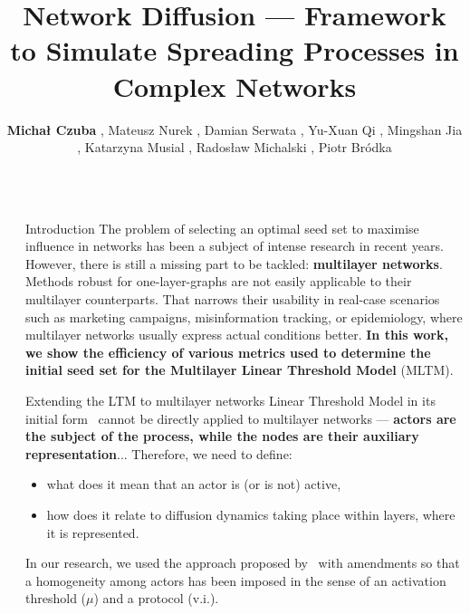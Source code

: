 \documentclass[final]{beamer}
\title{Network Diffusion --- Framework to Simulate Spreading Processes in Complex Networks}
\author{
    \textbf{Micha{\l} Czuba} \inst{1},
    Mateusz Nurek \inst{1},
    Damian Serwata \inst{1},
    Yu-Xuan Qi \inst{2},
    Mingshan Jia \inst{2},
    Katarzyna Musial \inst{2},
    Rados{\l}aw Michalski \inst{1},
    Piotr Br{\'o}dka \inst{1}
}
\institute[]{
  \inst{1} Wroc{\l}aw University of Science and Technology\\
  \inst{2} University of Technology Sydney
}
\newlength{\sepwidth}
\newlength{\colwidth}
\newcommand{\separatorcolumn}{\begin{column}{\sepwidth}\end{column}}
\begin{document}
\begin{frame}[t, fragile]
\begin{columns}[t]

\separatorcolumn
\begin{column}{\colwidth}

\begin{block}{Introduction}
    The problem of selecting an optimal seed set to maximise influence in networks has been a subject of intense research in recent years. However, there is still a missing part to be tackled: \textbf{multilayer networks}. Methods robust for one-layer-graphs are not easily applicable to their multilayer counterparts. That narrows their usability in real-case scenarios such as marketing campaigns, misinformation tracking, or epidemiology, where multilayer networks usually express actual conditions better. \textbf{In this work, we show the efficiency of various metrics used to determine the initial seed set for the Multilayer Linear Threshold Model} (MLTM).
\end{block}

\begin{alertblock}{Extending the LTM to multilayer networks}
    Linear Threshold Model in its initial form~\cite{kempe2003maximizing} cannot be directly applied to multilayer networks --- \textbf{actors are the subject of the process, while the nodes are their auxiliary representation}...
    Therefore, we need to define:
    \begin{itemize}
        \item what does it mean that an actor is (or is not) active,
        \item how does it relate to diffusion dynamics taking place within 
        layers, where it is represented.
    \end{itemize}
    In our research, we used the approach proposed by~\cite{zhong2022mltm} with amendments so that a homogeneity among actors has been imposed in the sense of an activation threshold ($\mu$) and a protocol (v.i.).


\end{alertblock}
\end{column}
\end{columns}
\end{frame}
\end{document}
